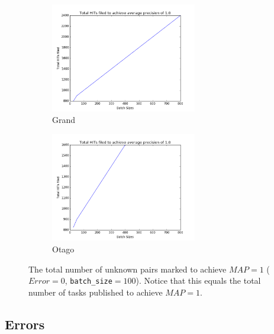 \begin{figure}[htbp]
  \centering
  \begin{subfigure}[t]{\textwidth}
      \centering
      \includegraphics[width=0.7\textwidth]{sizes/grtotal}
      \caption{Grand}
  \end{subfigure}%

    \begin{subfigure}[t]{\textwidth}
      \centering
      \includegraphics[width=0.7\textwidth]{sizes/ottotal}
      \caption{Otago}
  \end{subfigure}%
  \captionsetup{justification=centering}
  \caption{The total number of unknown pairs marked to achieve $MAP=1$
  ($Error=0$, \texttt{batch\_size}$=100$). Notice that this equals the total 
  number of tasks published to achieve $MAP=1$. }
  \label{fig:sizes_curves} %
\end{figure}


\subsection{Errors} %
\label{sub:errors}

